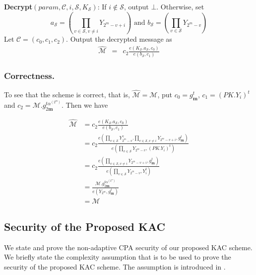 \noindent\textbf{Decrypt}$(param,\mathcal{C},i,\mathcal{S},K_{\mathcal{S}})$: If $i\notin\mathcal{S}$, output $\bot$. Otherwise, set
\begin{equation}
a_{\mathcal{S}}=\left(\prod_{v\in\mathcal{S},v\neq i}Y_{2^m-v+i}\right) \text{ and } b_{\mathcal{S}}=\left(\prod_{v\in\mathcal{S}}Y_{2^m-v}\right)\nonumber
\end{equation}
Let $\mathcal{C}=(c_0,c_1,c_2)$. Output the decrypted message as  
\begin{eqnarray} 
\hat{\mathcal{M}}&=&c_2\frac{{e}(K_{\mathcal{S}}.a_{\mathcal{S}},c_0)}{{e}(b_{\mathcal{S}},c_1)} \nonumber
\end{eqnarray}

\subsubsection{Correctness.} To see that the scheme is correct, that is, $\hat{\mathcal{M}}=\mathcal{M}$, put $c_0=g^{t}_{\mathbf{m}}$, $c_1=(PK.Y_i)^{t}$ and $c_2=\mathcal{M}.g^{t\alpha^{(2^m)}}_{2\mathbf{m}}$. Then we have

\begin{equation}
\begin{split}
 \hat{\mathcal{M}}&=c_2\frac{{e}(K_{\mathcal{S}}.a_{\mathcal{S}},c_0)}{{e}(b_{\mathcal{S}},c_1)}\\
 &=c_2\frac{e(\prod_{v\in\mathcal{S}}Y^{\gamma}_{2^m-v}.\prod_{v\in\mathcal{S},v\neq i}Y_{2^m-v+i},g^{t}_{\mathbf{m}})}{e(\prod_{v\in\mathcal{S}}Y_{2^m-v},(PK.Y_i)^{t})}\\
 &=c_2\frac{e(\prod_{v\in\mathcal{S},v\neq i}Y_{2^m-v+i},g^{t}_{\mathbf{m}})}{e(\prod_{v\in\mathcal{S}}Y_{2^m-v},Y_i^{t})}\\
 &=\frac{\mathcal{M}.g^{t\alpha^{(2^m)}}_{2\mathbf{m}}}{e(Y_{2^m},g^{t}_{\mathbf{m}})}\\
 &=\mathcal{M}\nonumber
\end{split} 
\end{equation}


\subsection{Security of the Proposed KAC}
\label{subsec:security1}

We state and prove the non-adaptive CPA security of our proposed KAC scheme. We briefly state the complexity assumption that is to be used to prove the security of the proposed KAC scheme. The assumption is introduced in \cite{boneh2014low}.

